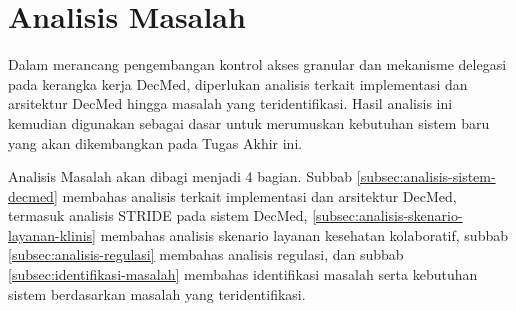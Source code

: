 \section{Analisis Masalah}
\label{sec:analisis-masalah}

Dalam merancang pengembangan kontrol akses granular dan mekanisme delegasi pada kerangka kerja DecMed, diperlukan analisis terkait implementasi dan arsitektur DecMed hingga masalah yang teridentifikasi. Hasil analisis ini kemudian digunakan sebagai dasar untuk merumuskan kebutuhan sistem baru yang akan dikembangkan pada Tugas Akhir ini.

Analisis Masalah akan dibagi menjadi 4 bagian. Subbab \ref{subsec:analisis-sistem-decmed} membahas analisis terkait implementasi dan arsitektur DecMed, termasuk analisis STRIDE pada sistem DecMed, \ref{subsec:analisis-skenario-layanan-klinis} membahas analisis skenario layanan kesehatan kolaboratif, subbab \ref{subsec:analisis-regulasi} membahas analisis regulasi, dan subbab \ref{subsec:identifikasi-masalah} membahas identifikasi masalah serta kebutuhan sistem berdasarkan masalah yang teridentifikasi.






